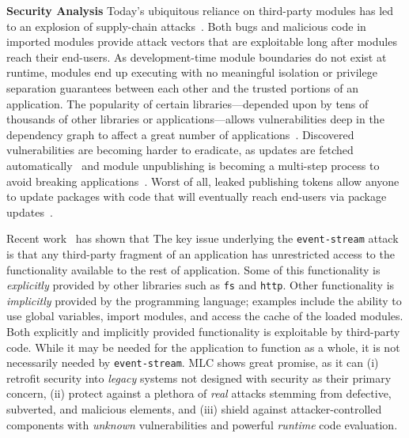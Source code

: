 \documentclass[letterpaper,twocolumn,10pt]{article}
\def\omit#1{}
\def\eg{{\em e.g.}, }
\newcommand{\heading}[1]{\vspace{2pt}\noindent\textbf{#1}\enspace}
\newcommand{\ttt}[1]{\texttt{#1}}
\begin{document}
\heading{Security Analysis}
Today's ubiquitous reliance on third-party modules has led to an explosion of supply-chain attacks~\cite{maass2016theory, lauinger2017thou, long2015owasp, cadariu2015tracking, breakapp:plos:2017, snyk}.
Both bugs and malicious code in imported modules provide attack vectors that are exploitable long after modules reach their end-users.
As development-time module boundaries do not exist at runtime, modules end up executing with no meaningful isolation or privilege separation guarantees between each other and the trusted portions of an application.
The popularity of certain libraries---depended upon by tens of thousands of other libraries or applications---allows vulnerabilities deep in the dependency graph to affect a great number of applications~\cite{kuppusamy2016diplomat, leftpad, npmstudy:19}.
Discovered vulnerabilities are becoming harder to eradicate, as updates are fetched automatically~\cite{npmFailure} and module unpublishing is becoming a multi-step process to avoid breaking applications~\cite{npmUnpublish}.
Worst of all,\omit{package developers accidentally publishing their security} leaked publishing tokens allow anyone to update packages with code that will eventually reach end-users via package updates~\cite{eslint1, eslint2}.

Recent work~\cite{dld:08, sandcrust, tsampas2017towards, breakapp:ndss:2018} has shown that 
The key issue underlying the \ttt{event-stream} attack is that any third-party fragment of an application has unrestricted access to the functionality available to the rest of application. %
Some of this functionality is \emph{explicitly} provided by other libraries such as \ttt{fs} and \ttt{http}.
Other functionality is \emph{implicitly} provided by the programming language;
  examples include the ability to use global variables, import modules, and access the cache of the loaded modules.
Both explicitly and implicitly provided functionality is exploitable by third-party code.
While it may be needed for the application to function as a whole, it is not necessarily needed by \ttt{event-stream}.
MLC shows great promise, as it can
(i) retrofit security into \emph{legacy} systems not designed with security as their primary concern,
(ii) protect against a plethora of \emph{real} attacks stemming from defective, subverted, and malicious elements, and
(iii) shield against attacker-controlled components with \emph{unknown} vulnerabilities and powerful \emph{runtime} code evaluation. %
\end{document}
